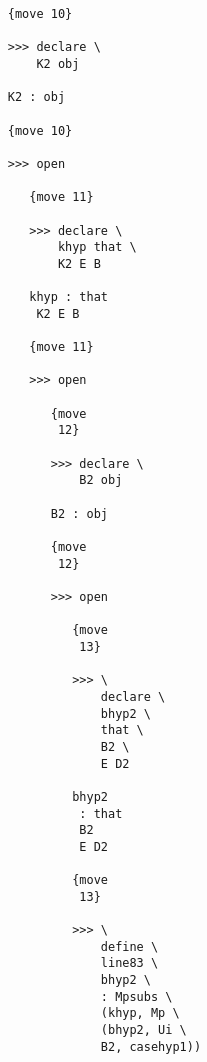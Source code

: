\documentclass[12pt]{article}
\begin{document}
\begin{verbatim}
                              {move 10}

                              >>> declare \
                                  K2 obj

                              K2 : obj

                              {move 10}

                              >>> open

                                 {move 11}

                                 >>> declare \
                                     khyp that \
                                     K2 E B

                                 khyp : that 
                                  K2 E B

                                 {move 11}

                                 >>> open

                                    {move 
                                     12}

                                    >>> declare \
                                        B2 obj

                                    B2 : obj

                                    {move 
                                     12}

                                    >>> open

                                       {move 
                                        13}

                                       >>> \
                                           declare \
                                           bhyp2 \
                                           that \
                                           B2 \
                                           E D2

                                       bhyp2 
                                        : that 
                                        B2 
                                        E D2

                                       {move 
                                        13}

                                       >>> \
                                           define \
                                           line83 \
                                           bhyp2 \
                                           : Mpsubs \
                                           (khyp, Mp \
                                           (bhyp2, Ui \
                                           B2, casehyp1))


\end{verbatim}
\end{document}
